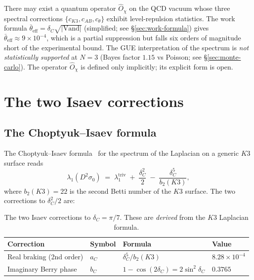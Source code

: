 \documentclass[11pt,a4paper]{article}
\newcommand{\dC}{\delta_C}
\newcommand{\Opchi}{\hat{O}_\chi}
\theoremstyle{plain}
\theoremstyle{definition}
\theoremstyle{remark}
\begin{document}
\begin{keyfind}
There may exist a quantum operator $\Opchi$ on the QCD vacuum whose
three spectral corrections $\{c_{K3}, c_{AB}, c_\theta\}$ exhibit
level-repulsion statistics.  The work formula
$\bar\theta_{\mathrm{eff}} = \dC \sqrt{|\mathrm{Vand}|}$ (simplified;
see \S\ref{sec:work-formula}) gives $\bar\theta_{\mathrm{eff}} \approx
9\times 10^{-4}$, which is a partial suppression but falls six orders
of magnitude short of the experimental bound.  The GUE interpretation
of the spectrum is \emph{not statistically supported} at $N=3$
(Bayes factor $1.15$ vs Poisson; see \S\ref{sec:monte-carlo}).  The
operator $\Opchi$ is defined only implicitly; its explicit form is
open.
\end{keyfind}

\section{The two Isaev corrections}
\label{sec:isaev}

\subsection{The Choptyuk--Isaev formula}

The Choptyuk--Isaev formula~\cite{isaev2024spinor} for the spectrum of
the Laplacian on a generic $K3$ surface reads
\begin{equation}\label{eq:choptyuk-isaev}
\lambda_1(D^2 \sigma_0)
  \;=\; \lambda_1^{\mathrm{triv}}
       \;+\; \frac{\dC^2}{2}
       \;-\; \frac{\dC^5}{b_2(K3)} ,
\end{equation}
where $b_2(K3) = 22$ is the second Betti number of the $K3$ surface.
The two corrections to $\dC^2/2$ are:

\begin{table}[h]
\centering
\small
\begin{tabular}{l l l l}
\toprule
Correction & Symbol & Formula & Value \\
\midrule
Real braking (2nd order) & $a_C$ & $\dC^5 / b_2(K3)$ & $8.28 \times 10^{-4}$ \\
Imaginary Berry phase    & $b_C$ & $1 - \cos(2\dC) = 2\sin^2\dC$ & $0.3765$ \\
\bottomrule
\end{tabular}
\caption{The two Isaev corrections to $\dC = \pi/7$.  These are
\emph{derived} from the $K3$ Laplacian formula.}
\label{tab:isaev}
\end{table}
\end{document}
